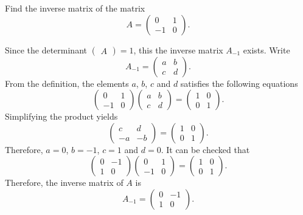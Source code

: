\begin{example}
  Find the inverse matrix of the matrix
  \[
    A=\begin{pmatrix}
    0 & 1\\
    -1 & 0
  \end{pmatrix}.
  \]
\end{example}
\begin{solution}
  Since the determinant $\begin{pmatrix} A \end{pmatrix}=1$, this the inverse matrix $A_{-1}$ exists. Write
  \[A_{-1}=\begin{pmatrix}
    a & b\\
    c & d
  \end{pmatrix}.\]
  From the definition, the elements $a$, $b$, $c$ and $d$ satisfies the following equations
  \[\begin{pmatrix}
    0 & 1\\
    -1 & 0
  \end{pmatrix}\begin{pmatrix}
    a & b\\
    c & d
  \end{pmatrix}=\begin{pmatrix}
    1 & 0\\
    0 & 1
  \end{pmatrix}.\]
  Simplifying the product yields
  \[\begin{pmatrix}
    c & d\\
    -a & -b
  \end{pmatrix}=\begin{pmatrix}
    1 & 0\\
    0 & 1
  \end{pmatrix}.\]
  Therefore, $a=0$, $b=-1$, $c=1$ and $d=0$.
  It can be checked that 
  \[\begin{pmatrix}
    0 & -1\\
    1 & 0
  \end{pmatrix}\begin{pmatrix}
    0 & 1\\
    -1 & 0
  \end{pmatrix}=\begin{pmatrix}
    1 & 0\\
    0 & 1
  \end{pmatrix}.
  \]
  Therefore, the inverse matrix of $A$ is
  \[A_{-1}=\begin{pmatrix}
    0 & -1\\
    1 & 0
  \end{pmatrix}.\]
\end{solution}

